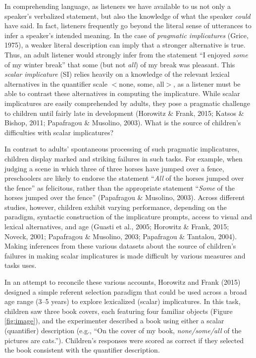 \documentclass[10pt, letterpaper]{article}
\begin{document}
In comprehending language, as listeners we have available to us not only
a speaker's verbalized statement, but also the knowledge of what the
speaker \emph{could} have said. In fact, listeners frequently go beyond
the literal sense of utterances to infer a speaker's intended meaning.
In the case of \emph{pragmatic implicatures} (Grice, 1975), a weaker
literal description can imply that a stronger alternative is true. Thus,
an adult listener would strongly infer from the statement ``I enjoyed
\emph{some} of my winter break'' that some (but not \emph{all}) of my
break was pleasant. This \emph{scalar implicature} (SI) relies heavily
on a knowledge of the relevant lexical alternatives in the quantifier
scale \(<\)none, some, all\(>\), as a listener must be able to contrast
these alternatives in computing the implicature. While scalar
implicatures are easily comprehended by adults, they pose a pragmatic
challenge to children until fairly late in development (Horowitz \&
Frank, 2015; Katsos \& Bishop, 2011; Papafragou \& Musolino, 2003). What
is the source of children's difficulties with scalar implicatures?

In contrast to adults' spontaneous processing of such pragmatic
implicatures, children display marked and striking failures in such
tasks. For example, when judging a scene in which three of three horses
have jumped over a fence, preschoolers are likely to endorse the
statement ``\emph{All} of the horses jumped over the fence'' as
felicitous, rather than the appropriate statement ``\emph{Some} of the
horses jumped over the fence'' (Papafragou \& Musolino, 2003). Across
different studies, however, children exhibit varying performance,
depending on the paradigm, syntactic construction of the implicature
prompts, access to visual and lexical alternatives, and age (Guasti et
al., 2005; Horowitz \& Frank, 2015; Noveck, 2001; Papafragou \&
Musolino, 2003; Papafragou \& Tantalou, 2004). Making inferences from
these various datasets about the source of children's failures in making
scalar implicatures is made difficult by various measures and tasks
uses.

In an attempt to reconcile these various accounts, Horowitz and Frank
(2015) designed a simple referent selection paradigm that could be used
across a broad age range (3--5 years) to explore lexicalized (scalar)
implicatures. In this task, children saw three book covers, each
featuring four familiar objects (Figure \ref{fig:image}), and the
experimenter described a book using either a scalar (quantifier)
description (e.g., ``On the cover of my book, \emph{none/some/all} of
the pictures are cats.''). Children's responses were scored as correct
if they selected the book consistent with the quantifier description.
\end{document}
